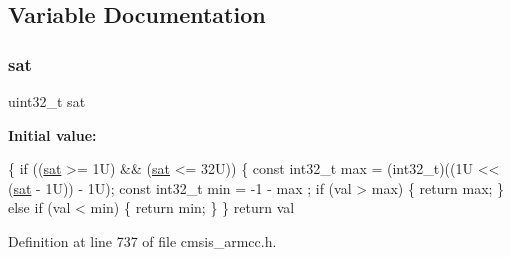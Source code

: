 \subsection{Variable Documentation}
\mbox{\label{group___c_m_s_i_s___core___instruction_interface_gaafcad33f86db3a8e1f55925989f9d2dc}} 
\subsubsection{\texorpdfstring{sat}{sat}}
{\footnotesize\ttfamily uint32\+\_\+t sat}

{\bfseries Initial value\+:}
\begin{DoxyCode}
\{
  \textcolor{keywordflow}{if} ((\hyperlink{group___c_m_s_i_s___core___instruction_interface_gaafcad33f86db3a8e1f55925989f9d2dc}{sat} >= 1U) && (\hyperlink{group___c_m_s_i_s___core___instruction_interface_gaafcad33f86db3a8e1f55925989f9d2dc}{sat} <= 32U))
  \{
    \textcolor{keyword}{const} int32\_t max = (int32\_t)((1U << (\hyperlink{group___c_m_s_i_s___core___instruction_interface_gaafcad33f86db3a8e1f55925989f9d2dc}{sat} - 1U)) - 1U);
    \textcolor{keyword}{const} int32\_t min = -1 - max ;
    \textcolor{keywordflow}{if} (val > max)
    \{
      \textcolor{keywordflow}{return} max;
    \}
    \textcolor{keywordflow}{else} \textcolor{keywordflow}{if} (val < min)
    \{
      \textcolor{keywordflow}{return} min;
    \}
  \}
  \textcolor{keywordflow}{return} val
\end{DoxyCode}


Definition at line 737 of file cmsis\+\_\+armcc.\+h.

